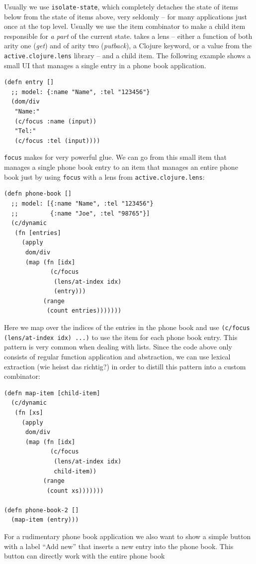 \documentclass[sigplan,screen]{acmart}
\begin{document}
Usually we use \texttt{isolate-state}, which completely detaches the
state of items below from the state of items above, very seldomly --
for many applications just once at the top level. Usually we use the
item combinator  to make a child item responsible for
\textit{a part} of the current state.  takes a lens --
either a function of both arity one (\textit{get}) and of arity two
(\textit{putback}), a Clojure keyword, or a value from the
\texttt{active.clojure.lens} library -- and a child item. The
following example shows a small UI that manages a single entry in a
phone book application.
%
\begin{verbatim}
(defn entry []
  ;; model: {:name "Name", :tel "123456"}
  (dom/div
   "Name:"
   (c/focus :name (input))
   "Tel:"
   (c/focus :tel (input))))
\end{verbatim}
%
\texttt{focus} makes for very powerful glue. We can go from this small
item that manages a single phone book entry to an item that manages an
entire phone book just by using \texttt{focus} with a lens from
\texttt{active.clojure.lens}:
%
\begin{verbatim}
(defn phone-book []
  ;; model: [{:name "Name", :tel "123456"}
  ;;         {:name "Joe", :tel "98765"}]
  (c/dynamic
   (fn [entries]
     (apply
      dom/div
      (map (fn [idx]
             (c/focus
              (lens/at-index idx)
              (entry)))
           (range
            (count entries)))))))
\end{verbatim}
%
Here we map over the indices of the entries in the phone book and use
\texttt{(c/focus (lens/at-index idx) ...)} to use the 
item for each phone book entry. This pattern is very common when
dealing with lists. Since the code above only consists of regular
function application and abstraction, we can use lexical extraction
(wie heisst das richtig?) in order to distill this pattern into a
custom combinator:
%
\begin{verbatim}
(defn map-item [child-item]
  (c/dynamic
   (fn [xs]
     (apply
      dom/div
      (map (fn [idx]
             (c/focus
              (lens/at-index idx)
              child-item))
           (range
            (count xs)))))))

(defn phone-book-2 []
  (map-item (entry)))
\end{verbatim}
%
For a rudimentary phone book application we also want to show a simple
button with a label ``Add new'' that inserts a new entry into the
phone book. This button can directly work with the entire phone book
\end{document}
